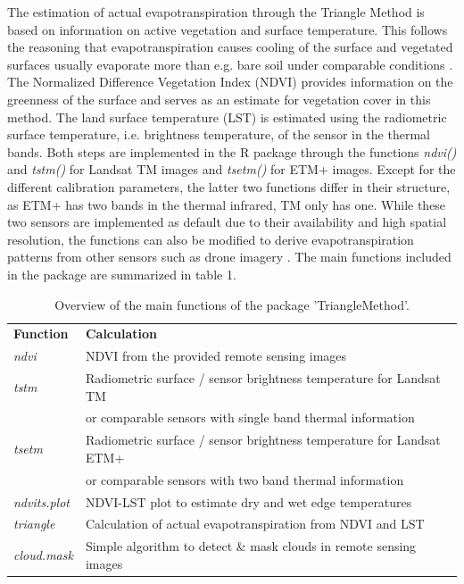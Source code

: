 \documentclass[12pt]{article}
\begin{document}
The estimation of actual evapotranspiration through the Triangle Method is based on information on active vegetation and surface temperature. This follows the reasoning that evapotranspiration causes cooling of the surface and vegetated surfaces usually evaporate more than e.g. bare soil under comparable conditions \citep{Carlson2007}. The Normalized Difference Vegetation Index (NDVI) provides information on the greenness of the surface and serves as an estimate for vegetation cover in this method. The land surface temperature (LST) is estimated using the radiometric surface temperature, i.e. brightness temperature, of the sensor in the thermal bands. Both steps are implemented in the R package through the functions \textit{ndvi()} and \textit{tstm()} for Landsat TM images and \textit{tsetm()} for ETM+ images. Except for the different calibration parameters, the latter two functions differ in their structure, as ETM+ has two bands in the thermal infrared, TM only has one. While these two sensors are implemented as default due to their availability and high spatial resolution, the functions can also be modified to derive evapotranspiration patterns from other sensors such as drone imagery \citep{Marzahn2020}. The main functions included in the package are summarized in table 1.

\begin{table}[h!]
\begin{center}
\caption{Overview of the main functions of the package 'TriangleMethod'.}
\label{tab:mainfunc}
\begin{tabular}{ l | l }
\textbf{Function} & \textbf{Calculation} \\
\textit{ndvi} & NDVI from the provided remote sensing images \\
\textit{tstm} & Radiometric surface / sensor brightness temperature for Landsat TM\\
& or comparable sensors with single band thermal information\\
\textit{tsetm} & Radiometric surface / sensor brightness temperature for Landsat ETM+\\
& or comparable sensors with two band thermal information\\
\textit{ndvits.plot} & NDVI-LST plot to estimate dry and wet edge temperatures\\
\textit{triangle} & Calculation of actual evapotranspiration from NDVI and LST\\
\textit{cloud.mask} & Simple algorithm to detect \& mask clouds in remote sensing images\\
\end{tabular}
\end{center}
\end{table}
\end{document}
